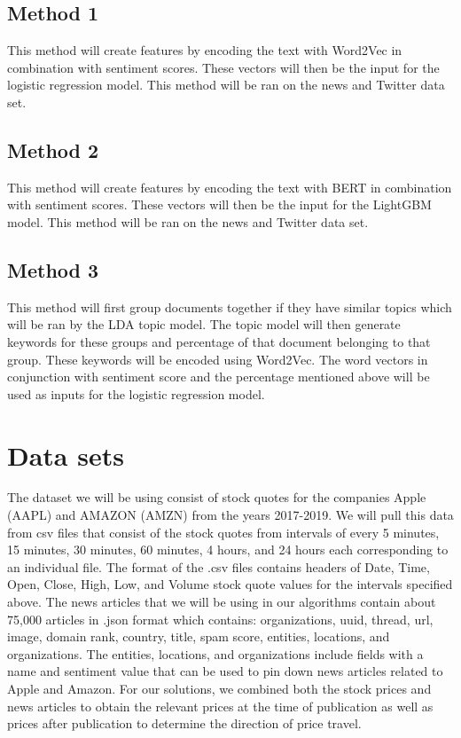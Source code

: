 \documentclass[conference]{IEEEtran}
\begin{document}
\subsection{Method 1}
This method will create features by encoding the text with Word2Vec in combination with sentiment scores. These vectors will then be the input for the logistic regression model. This method will be ran on the news and Twitter data set. 
\subsection{Method 2}
This method will create features by encoding the text with BERT in combination with sentiment scores. These vectors will then be the input for the LightGBM model. This method will be ran on the news and Twitter data set. 
\subsection{Method 3}
This method will first group documents together if they have similar topics which will be ran by the LDA topic model. The topic model will then generate keywords for these groups and percentage of that document belonging to that group. These keywords will be encoded using Word2Vec. The word vectors in conjunction with sentiment score and the percentage mentioned above will be used as inputs for the logistic regression model.

\section{Data sets}
The dataset we will be using consist of stock quotes for the companies Apple (AAPL) and AMAZON (AMZN) from the years 2017-2019. We will pull this data from csv files that consist of the stock quotes from intervals of every 5 minutes, 15 minutes, 30 minutes, 60 minutes, 4 hours, and 24 hours each corresponding to an individual file. The format of the .csv files contains headers of Date, Time, Open, Close, High, Low, and Volume stock quote values for the intervals specified above. The news articles that we will be using in our algorithms contain about 75,000 articles in .json format which contains: organizations, uuid, thread, url, image, domain rank, country, title, spam score, entities, locations, and organizations. The entities, locations, and organizations include fields with a name and sentiment value that can be used to pin down news articles related to Apple and Amazon.
For our solutions, we combined both the stock prices and news articles to obtain the relevant prices at the time of publication as well as prices after publication to determine the direction of price travel.
\end{document}
